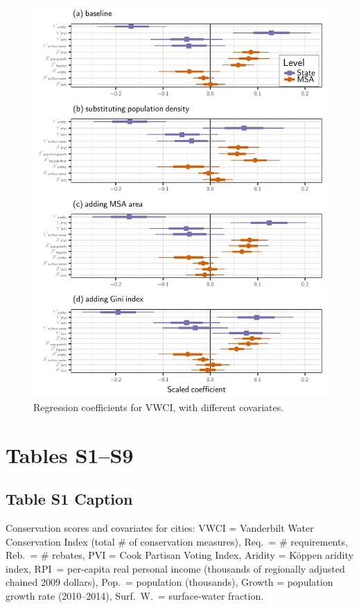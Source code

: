 \documentclass[draft]{agujournal}
\begin{document}
\begin{figure}
\includegraphics[width=6.25in]{figures_si/vwci_vars_cat_plots-1} \caption[Regression coefficients for VWCI, with different covariates]{Regression coefficients for VWCI, with different covariates.}\label{fig:vwci_vars_cat_plots}
\end{figure}




\clearpage
\section{Tables S1--S9}
\subsection*{Table S1 Caption}
\begin{table}[H]
\centering
\caption{Conservation scores and covariates for  cities: VWCI = Vanderbilt Water Conservation Index (total \# of conservation measures), Req.\ = \# requirements, Reb.\ = \# rebates, PVI = Cook Partisan Voting Index, Aridity = K\"oppen aridity index, RPI\ = per-capita real personal income (thousands of regionally adjusted chained 2009 dollars), Pop.\ = population (thousands), Growth = population growth rate (2010--2014), Surf.\ W.\ = surface-water fraction.}
\label{tab:vwci}
\end{table}
\end{document}
